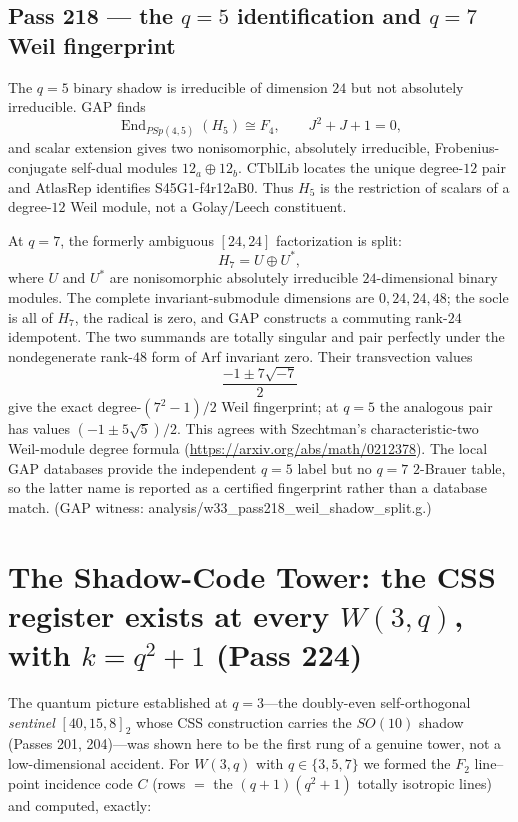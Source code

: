 \documentclass[12pt,a4paper]{article}
\def\mathbb#1{#1}%
\def\mathrm#1{#1}%
\def\mathbf#1{#1}%
\def\texttt#1{#1}%
\theoremstyle{definition}
\newcommand{\PSp}{\mathrm{PSp}}
\begin{document}
\subsection{Pass 218 --- the $q=5$ identification and $q=7$ Weil fingerprint}
\label{ssec:pass218}

The $q=5$ binary shadow is irreducible of dimension $24$ but not absolutely
irreducible.  GAP finds
\[
 \operatorname{End}_{\PSp(4,5)}(H_5)\cong\mathbb F_4,
 \qquad J^2+J+1=0,
\]
and scalar extension gives two nonisomorphic, absolutely irreducible,
Frobenius-conjugate self-dual modules $12_a\oplus12_b$.  CTblLib locates the
unique degree-$12$ pair and AtlasRep identifies
\texttt{S45G1-f4r12aB0}.  Thus $H_5$ is the restriction of scalars of a
degree-$12$ Weil module, not a Golay/Leech constituent.

At $q=7$, the formerly ambiguous $[24,24]$ factorization is split:
\[
 H_7=U\oplus U^*,
\]
where $U$ and $U^*$ are nonisomorphic absolutely irreducible
$24$-dimensional binary modules.  The complete invariant-submodule
dimensions are $0,24,24,48$; the socle is all of $H_7$, the radical is zero,
and GAP constructs a commuting rank-$24$ idempotent.  The two summands are
totally singular and pair perfectly under the nondegenerate rank-$48$ form
of Arf invariant zero.  Their
transvection values
\[
 \frac{-1\pm7\sqrt{-7}}2
\]
give the exact degree-$(7^2-1)/2$ Weil fingerprint; at $q=5$ the analogous
pair has values $(-1\pm5\sqrt5)/2$.  This agrees with Szechtman's
characteristic-two Weil-module degree formula
(\url{https://arxiv.org/abs/math/0212378}).  The local GAP databases provide
the independent $q=5$ label but no $q=7$ $2$-Brauer table, so the latter name
is reported as a certified fingerprint rather than a database match.
(GAP witness:
\texttt{analysis/w33\_pass218\_weil\_shadow\_split.g}.)


\section{The Shadow-Code Tower: the CSS register exists at every $W(3,q)$, with $k=q^2+1$ (Pass 224)}

The quantum picture established at $q=3$---the doubly-even self-orthogonal
\emph{sentinel} $[40,15,8]_2$ whose CSS construction carries the $\mathrm{SO}(10)$
shadow (Passes 201, 204)---was shown here to be the first rung of a genuine
tower, not a low-dimensional accident. For $W(3,q)$ with $q\in\{3,5,7\}$ we
formed the $\mathbf{F}_2$ line--point incidence code $C$ (rows $=$ the
$(q+1)(q^2+1)$ totally isotropic lines) and computed, exactly:
\end{document}
